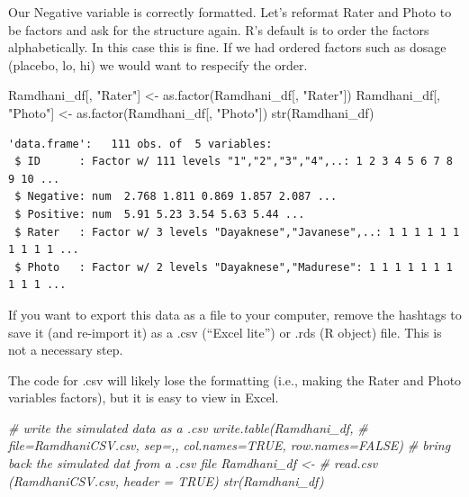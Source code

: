 \documentclass[
  11pt,
]{book}
\newenvironment{Shaded}{\begin{snugshade}}{\end{snugshade}}
\newcommand{\CommentTok}[1]{\textcolor[rgb]{0.56,0.35,0.01}{\textit{#1}}}
\newcommand{\FunctionTok}[1]{\textcolor[rgb]{0.00,0.00,0.00}{#1}}
\newcommand{\NormalTok}[1]{#1}
\newcommand{\OtherTok}[1]{\textcolor[rgb]{0.56,0.35,0.01}{#1}}
\newcommand{\StringTok}[1]{\textcolor[rgb]{0.31,0.60,0.02}{#1}}
\begin{document}
Our Negative variable is correctly formatted. Let's reformat Rater and Photo to be factors and ask for the structure again. R's default is to order the factors alphabetically. In this case this is fine. If we had ordered factors such as dosage (placebo, lo, hi) we would want to respecify the order.

\begin{Shaded}
\begin{Highlighting}[]
\NormalTok{Ramdhani\_df[, }\StringTok{"Rater"}\NormalTok{] }\OtherTok{\textless{}{-}} \FunctionTok{as.factor}\NormalTok{(Ramdhani\_df[, }\StringTok{"Rater"}\NormalTok{])}
\NormalTok{Ramdhani\_df[, }\StringTok{"Photo"}\NormalTok{] }\OtherTok{\textless{}{-}} \FunctionTok{as.factor}\NormalTok{(Ramdhani\_df[, }\StringTok{"Photo"}\NormalTok{])}
\FunctionTok{str}\NormalTok{(Ramdhani\_df)}
\end{Highlighting}
\end{Shaded}

\begin{verbatim}
'data.frame':   111 obs. of  5 variables:
 $ ID      : Factor w/ 111 levels "1","2","3","4",..: 1 2 3 4 5 6 7 8 9 10 ...
 $ Negative: num  2.768 1.811 0.869 1.857 2.087 ...
 $ Positive: num  5.91 5.23 3.54 5.63 5.44 ...
 $ Rater   : Factor w/ 3 levels "Dayaknese","Javanese",..: 1 1 1 1 1 1 1 1 1 1 ...
 $ Photo   : Factor w/ 2 levels "Dayaknese","Madurese": 1 1 1 1 1 1 1 1 1 1 ...
\end{verbatim}

If you want to export this data as a file to your computer, remove the hashtags to save it (and re-import it) as a .csv (``Excel lite'') or .rds (R object) file. This is not a necessary step.

The code for .csv will likely lose the formatting (i.e., making the Rater and Photo variables factors), but it is easy to view in Excel.

\begin{Shaded}
\begin{Highlighting}[]
\CommentTok{\# write the simulated data as a .csv write.table(Ramdhani\_df,}
\CommentTok{\# file=\textquotesingle{}RamdhaniCSV.csv\textquotesingle{}, sep=\textquotesingle{},\textquotesingle{}, col.names=TRUE, row.names=FALSE)}
\CommentTok{\# bring back the simulated dat from a .csv file Ramdhani\_df \textless{}{-}}
\CommentTok{\# read.csv (\textquotesingle{}RamdhaniCSV.csv\textquotesingle{}, header = TRUE) str(Ramdhani\_df)}
\end{Highlighting}
\end{Shaded}
\end{document}
